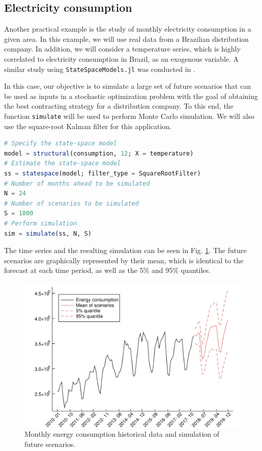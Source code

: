 \documentclass{juliacon}
\begin{document}
\subsection{Electricity consumption}

Another practical example is the study of monthly electricity consumption in a given area. In this example, we will use real data from a Brazilian distribution company. In addition, we will consider a temperature series, which is highly correlated to electricity consumption in Brazil, as an exogenous variable. A similar study using \texttt{StateSpaceModels.jl} was conducted in \cite{saavedra2018simulating}.

In this case, our objective is to simulate a large set of future scenarios that can be used as inputs in a stochastic optimization problem with the goal of obtaining the best contracting strategy for a distribution company. To this end, the function \texttt{simulate} will be used to perform Monte Carlo simulation. We will also use the square-root Kalman filter for this application.
%
\begin{lstlisting}[language = Julia]
# Specify the state-space model
model = structural(consumption, 12; X = temperature)
# Estimate the state-space model
ss = statespace(model; filter_type = SquareRootFilter)
# Number of months ahead to be simulated
N = 24
# Number of scenarios to be simulated
S = 1000
# Perform simulation
sim = simulate(ss, N, S)
\end{lstlisting}

The time series and the resulting simulation can be seen in Fig. \ref{fig:energy_simulation}. The future scenarios are graphically represented by their mean, which is identical to the forecast at each time period, as well as the 5\% and 95\% quantiles.
%
\begin{figure}[h]
	\centering
	\includegraphics[width=\columnwidth]{Figures/energy_simulation.pdf}
	\caption{Monthly energy consumption historical data and simulation of future scenarios.}
	\label{fig:energy_simulation}
\end{figure}
\end{document}
